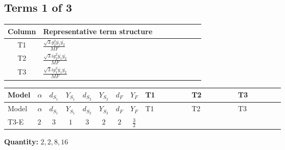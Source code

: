 \documentclass[8pt]{article}
\begin{document}
\begin{landscape}
\subsection*{Terms 1 of 3}
\begin{center}
\begin{tabular}{@{}c >{\raggedright\arraybackslash}p{0.82\linewidth}@{}}
\toprule
Column & Representative term structure \\
\midrule
T1 & \(\displaystyle \frac{\sqrt{3} g_{2}^{2} \overline{y_{1}} \overline{y_{2}}}{MF}\) \\
\midrule
T2 & \(\displaystyle \frac{\sqrt{3} i g_{2}^{2} \overline{y_{1}} \overline{y_{2}}}{MF}\) \\
\midrule
T3 & \(\displaystyle \frac{\sqrt{3} i g_{1}^{2} \overline{y_{1}} \overline{y_{2}}}{MF}\) \\
\midrule
\bottomrule
\end{tabular}
\end{center}
\smallskip
\tiny
\begin{longtable}{@{}llcccccc >{\raggedright\arraybackslash}p{0.21\linewidth} >{\raggedright\arraybackslash}p{0.21\linewidth} >{\raggedright\arraybackslash}p{0.21\linewidth}@{}}
\toprule
Model & $\alpha$ & $d_{S_1}$ & $Y_{S_1}$ & $d_{S_2}$ & $Y_{S_2}$ & $d_F$ & $Y_F$ & T1 & T2 & T3 \\
\midrule
\endfirsthead
\toprule
Model & $\alpha$ & $d_{S_1}$ & $Y_{S_1}$ & $d_{S_2}$ & $Y_{S_2}$ & $d_F$ & $Y_F$ & T1 & T2 & T3 \\
\midrule
\endhead
T3-E & $2$ & $3$ & $1$ & $3$ & $2$ & $2$ & $\frac{3}{2}$ & \scriptsize\adjustbox{max width=\linewidth}{$\begin{gathered} \frac{\sqrt{3} g_{2}^{2} \overline{y_{1}} \overline{y_{2}}}{6 MF}\end{gathered}$} & \scriptsize\adjustbox{max width=\linewidth}{$\begin{gathered} - \frac{49 \sqrt{3} i g_{2}^{2} \overline{y_{1}} \overline{y_{2}}}{24 MF}\end{gathered}$} & \scriptsize\adjustbox{max width=\linewidth}{$\begin{gathered} - \frac{9 \sqrt{3} i g_{1}^{2} \overline{y_{1}} \overline{y_{2}}}{8 MF}\end{gathered}$} \\
\midrule
\bottomrule
\end{longtable}
\clearpage
\noindent\textbf{Quantity: }$\mathrm{2,2,8,16}$\par\smallskip

\end{landscape}
\end{document}
